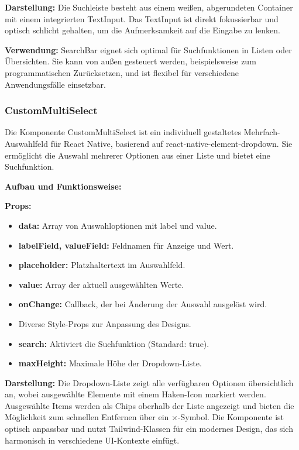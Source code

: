 \textbf{Darstellung:}
Die Suchleiste besteht aus einem weißen, abgerundeten Container mit einem integrierten TextInput. Das TextInput ist direkt fokussierbar und optisch schlicht gehalten, um die Aufmerksamkeit auf die Eingabe zu lenken.

\noindent\textbf{Verwendung:} SearchBar eignet sich optimal für Suchfunktionen in Listen oder Übersichten. Sie kann von außen gesteuert werden, beispielsweise zum programmatischen Zurücksetzen, und ist flexibel für verschiedene Anwendungsfälle einsetzbar.

\subsubsection{CustomMultiSelect}
Die Komponente CustomMultiSelect ist ein individuell gestaltetes Mehrfach-Auswahlfeld für React Native, basierend auf react-native-element-dropdown. Sie ermöglicht die Auswahl mehrerer Optionen aus einer Liste und bietet eine Suchfunktion.

\noindent\textbf{Aufbau und Funktionsweise:}

\textbf{Props:}
\begin{itemize}
    \item \textbf{data:} Array von Auswahloptionen mit label und value.
    \item \textbf{labelField, valueField:} Feldnamen für Anzeige und Wert.
    \item \textbf{placeholder:} Platzhaltertext im Auswahlfeld.
    \item \textbf{value:} Array der aktuell ausgewählten Werte.
    \item \textbf{onChange:} Callback, der bei Änderung der Auswahl ausgelöst wird.
    \item Diverse Style-Props zur Anpassung des Designs.
    \item \textbf{search:} Aktiviert die Suchfunktion (Standard: true).
    \item \textbf{maxHeight:} Maximale Höhe der Dropdown-Liste.
\end{itemize}

\textbf{Darstellung:}
Die Dropdown-Liste zeigt alle verfügbaren Optionen übersichtlich an, wobei ausgewählte Elemente mit einem Haken-Icon markiert werden. Ausgewählte Items werden als Chips oberhalb der Liste angezeigt und bieten die Möglichkeit zum schnellen Entfernen über ein ×-Symbol. Die Komponente ist optisch anpassbar und nutzt Tailwind-Klassen für ein modernes Design, das sich harmonisch in verschiedene UI-Kontexte einfügt.

